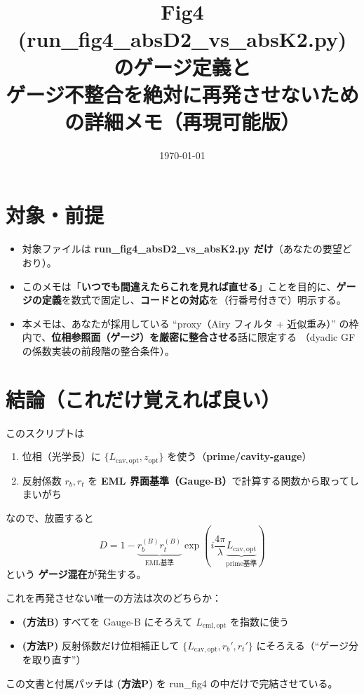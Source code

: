 \documentclass[a4paper,11pt]{article}
\title{Fig4 (run\_fig4\_absD2\_vs\_absK2.py) のゲージ定義と\\
ゲージ不整合を絶対に再発させないための詳細メモ（再現可能版）}
\author{}
\date{\today}
\begin{document}
\maketitle

\section*{対象・前提}
\begin{itemize}
  \item 対象ファイルは \textbf{run\_fig4\_absD2\_vs\_absK2.py だけ}（あなたの要望どおり）。
  \item このメモは「\textbf{いつでも間違えたらこれを見れば直せる}」ことを目的に、\textbf{ゲージの定義}を数式で固定し、\textbf{コードとの対応}を（行番号付きで）明示する。
  \item 本メモは、あなたが採用している ``proxy（Airy フィルタ + 近似重み）'' の枠内で、\textbf{位相参照面（ゲージ）を厳密に整合させる}話に限定する
  （dyadic GF の係数実装の前段階の整合条件）。
\end{itemize}

\section*{結論（これだけ覚えれば良い）}
このスクリプトは
\begin{enumerate}
  \item 位相（光学長）に \(\{L_{\mathrm{cav,opt}}, z_{\mathrm{opt}}\}\) を使う（\textbf{prime/cavity-gauge}）
  \item 反射係数 \(r_b,r_t\) を \textbf{EML 界面基準（Gauge-B）}で計算する関数から取ってしまいがち
\end{enumerate}
なので、放置すると
\[
\boxed{
D = 1 - \underbrace{r_b^{(B)} r_t^{(B)}}_{\text{EML基準}}
\exp\!\left(i\frac{4\pi}{\lambda} \underbrace{L_{\mathrm{cav,opt}}}_{\text{prime基準}}\right)
}
\]
という \textbf{ゲージ混在}が発生する。

\bigskip
\noindent
これを再発させない唯一の方法は次のどちらか：
\begin{itemize}
  \item \textbf{(方法B)} すべてを Gauge-B にそろえて \(L_{\mathrm{eml,opt}}\) を指数に使う
  \item \textbf{(方法P)} 反射係数だけ位相補正して \(\{L_{\mathrm{cav,opt}}, r_b', r_t'\}\) にそろえる（``ゲージ分を取り直す''）
\end{itemize}
この文書と付属パッチは \textbf{(方法P)} を run\_fig4 の中だけで完結させている。
\end{document}
